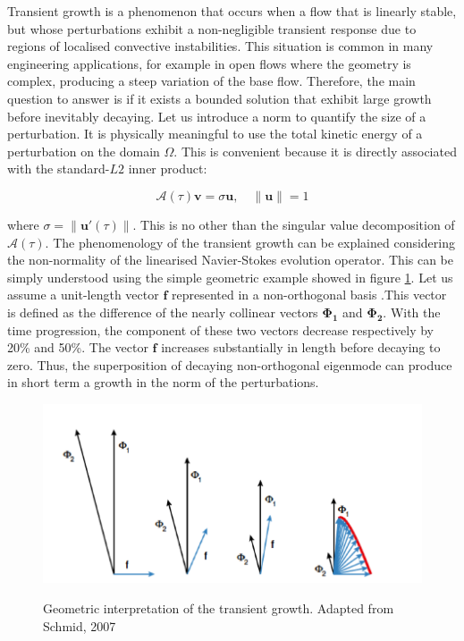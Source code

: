 Transient growth  is a phenomenon that occurs when a flow that is linearly stable, but whose perturbations exhibit a non-negligible transient response due to regions of localised convective instabilities. This situation is common in many engineering applications, for example in open flows where the geometry is complex, producing a steep variation of the base flow. Therefore, the main question to answer is if it exists a bounded solution that exhibit large growth before inevitably decaying. Let us introduce a norm to quantify the size of a perturbation. It is physically meaningful to use the total kinetic energy of a perturbation on the domain $\Omega$. This is convenient because it is directly associated with the
standard-$L2$ inner product:

\begin{equation}
\mathcal{A}(\tau)\mathbf{v}=\sigma \mathbf{u}, \quad \left\| \mathbf{u} \right\|=1
\end{equation}


where $\sigma=\left\| \mathbf{u'}(\tau)\right\|$. This is no other
than the singular value decomposition of $\mathcal{A}(\tau)$. The
phenomenology of the transient growth can be explained considering the
non-normality of the linearised Navier-Stokes evolution operator. This
can be simply understood using the simple geometric example showed in
figure \ref{TG}. Let us assume a unit-length vector $\mathbf{f}$
represented in a non-orthogonal basis .This vector is defined as the
difference of the nearly collinear vectors $\mathbf{\Phi_1}$ and
$\mathbf{\Phi_2}$.  With the time progression, the component of these
two vectors decrease respectively by 20\% and 50\%. The vector
$\mathbf{f}$ increases substantially in length before decaying to
zero. Thus, the superposition of decaying non-orthogonal eigenmode can
produce in short term a growth in the norm of the perturbations.


\begin{figure}[!htbp]
\centering
 \label{TG}
 {\includegraphics[width=1 \textwidth]{img/transient_growth.png}}
   \caption {Geometric interpretation of the transient growth. Adapted from Schmid, 2007 }
\end{figure}


